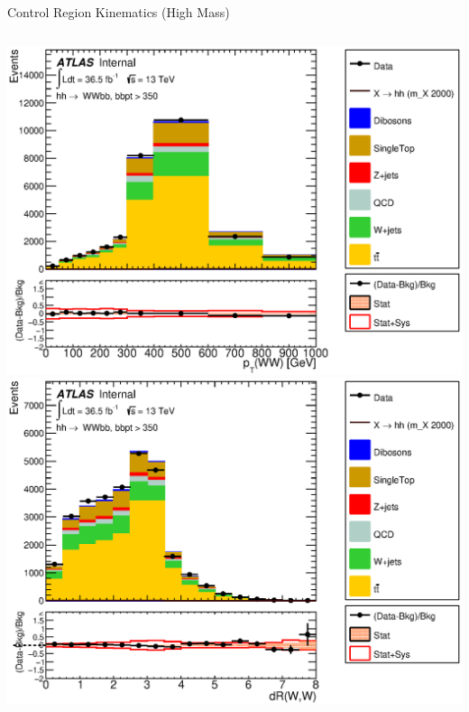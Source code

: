 \documentclass{beamer}
\begin{document}
{\begin{frame}{Control Region Kinematics (High Mass)}
\begin{columns}
      \includegraphics*[width=1.9\textwidth] {../chapters/dihiggs2/figures/ControlPlots/36ifb_CPUpdated_opt2000_mBBcr_plots_103/C_mBBcr_opt2000ichep_bbpt350_WWPt_regionA_met25d020}\\
      \includegraphics*[width=1.9\textwidth] {../chapters/dihiggs2/figures/ControlPlots/36ifb_CPUpdated_opt2000_mBBcr_plots_103/C_mBBcr_opt2000ichep_bbpt350_drww_regionA_met25d020}

\end{columns}
\end{frame}}
\end{document}
